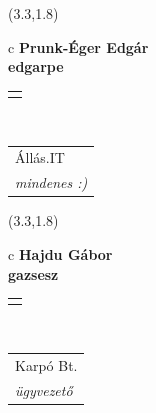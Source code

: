 \documentclass[11pt]{article}
\begin{document}
\makebox(3.3,1.8){
  \renewcommand\arraystretch{1.3}
  \begin{tabular}[c]{c}
    \hspace{8.5mm}
    \LARGE\bf{ Prunk-Éger Edgár }\\
    \hspace{8.5mm}
    \Large{ edgarpe }\\
    \renewcommand\arraystretch{3}
    \begin{tabular}[c]{c}
      \centering
      \fontfamily{phv}\selectfont{
        \textbf{
          \textsc{
            \scriptsize{
            \color{Bright}{ Ismerkedő }\color{Dark}{ Webmester }\color{Bright}{ Sminkmester }\color{Dark}{ Programozó }
            }
          }
        }
      }
    \end{tabular}
    \\
    \renewcommand\arraystretch{1}
    \begin{tabular}{p{3.3in}}
      \hspace{.7cm}Állás.IT\\
      \hspace{.7cm}\emph{ mindenes :) }\\
    \end{tabular}
  \end{tabular}
}

\makebox(3.3,1.8){
  \renewcommand\arraystretch{1.3}
  \begin{tabular}[c]{c}
    \hspace{8.5mm}
    \LARGE\bf{ Hajdu Gábor }\\
    \hspace{8.5mm}
    \Large{ gazsesz }\\
    \renewcommand\arraystretch{3}
    \begin{tabular}[c]{c}
      \centering
      \fontfamily{phv}\selectfont{
        \textbf{
          \textsc{
            \scriptsize{
            \color{Bright}{ Ismerkedő }\color{Dark}{ Webmester }\color{Dark}{ Sminkmester }\color{Bright}{ Programozó }
            }
          }
        }
      }
    \end{tabular}
    \\
    \renewcommand\arraystretch{1}
    \begin{tabular}{p{3.3in}}
      \hspace{.7cm}Karpó Bt.\\
      \hspace{.7cm}\emph{ ügyvezető }\\
    \end{tabular}
  \end{tabular}
}
\end{document}
